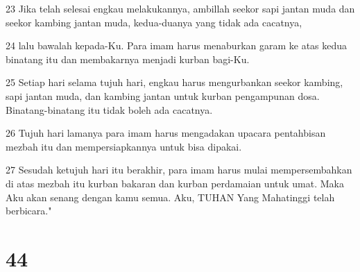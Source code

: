 \par 23 Jika telah selesai engkau melakukannya, ambillah seekor sapi jantan muda dan seekor kambing jantan muda, kedua-duanya yang tidak ada cacatnya,
\par 24 lalu bawalah kepada-Ku. Para imam harus menaburkan garam ke atas kedua binatang itu dan membakarnya menjadi kurban bagi-Ku.
\par 25 Setiap hari selama tujuh hari, engkau harus mengurbankan seekor kambing, sapi jantan muda, dan kambing jantan untuk kurban pengampunan dosa. Binatang-binatang itu tidak boleh ada cacatnya.
\par 26 Tujuh hari lamanya para imam harus mengadakan upacara pentahbisan mezbah itu dan mempersiapkannya untuk bisa dipakai.
\par 27 Sesudah ketujuh hari itu berakhir, para imam harus mulai mempersembahkan di atas mezbah itu kurban bakaran dan kurban perdamaian untuk umat. Maka Aku akan senang dengan kamu semua. Aku, TUHAN Yang Mahatinggi telah berbicara."

\chapter{44}

